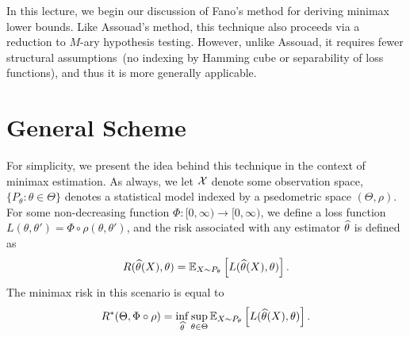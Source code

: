 \documentclass[12pt]{article}
\begin{document}
	\MakeScribeTop

In this lecture, we begin our discussion of Fano's method for deriving minimax lower bounds. Like Assouad's method, this technique also proceeds via a reduction to $M$-ary hypothesis testing. However, unlike Assouad, it requires fewer structural assumptions~(no indexing by Hamming cube or separability of loss functions), and thus it is more generally applicable. 


\section{General Scheme} 
\label{sec:assouad-general}
For simplicity, we present the idea behind this technique in the context of minimax estimation. As always, we let ${\cal X}$ denote some observation space, $\{P_\theta: \theta \in \Theta\}$ denotes a statistical model indexed by a psedometric space $(\Theta, \rho)$. For some non-decreasing function $\Phi:[0, \infty) \to [0, \infty)$, we define a loss function $L(\theta, \theta') = \Phi \circ \rho(\theta, \theta')$, and the risk associated with any estimator $\widehat{\theta}$ is defined as 
\begin{align}
R(\widehat{\theta}(X), \theta) = \mathbb{E}_{X \sim P_\theta}\left[ L(\widehat{\theta}(X), \theta) \right]. 
\end{align}
The minimax risk in this scenario is equal to 
\begin{align}
R^*(\Theta, \Phi \circ \rho) = \inf_{\widehat{\theta}}\sup_{\theta \in \Theta}\mathbb{E}_{X \sim P_\theta}\left[ L(\widehat{\theta}(X), \theta) \right]. 
\end{align}
\end{document}
